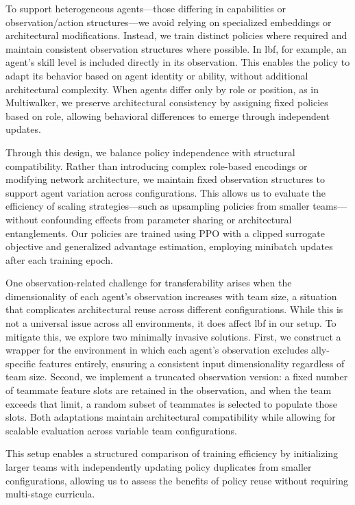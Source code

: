 To support heterogeneous agents—those differing in capabilities or observation/action 
structures—we avoid relying on specialized embeddings or architectural modifications. 
Instead, we train distinct policies where required and maintain consistent observation 
structures where possible. In \gls{lbf}, for example, an agent's skill level is included 
directly in its observation. This enables the policy to adapt its behavior based on 
agent identity or ability, without additional architectural complexity. 
When agents differ only by role or position, as in Multiwalker, 
we preserve architectural consistency by assigning fixed policies based on role, 
allowing behavioral differences to emerge through independent updates.

Through this design, we balance policy independence with structural compatibility. 
Rather than introducing complex role-based encodings or modifying network architecture, 
we maintain fixed observation structures to support agent variation across configurations. 
This allows us to evaluate the efficiency of scaling strategies—such as upsampling policies from 
smaller teams—without confounding effects from parameter sharing or architectural entanglements. 
Our policies are trained using PPO with a clipped surrogate objective and generalized 
advantage estimation, employing minibatch updates after each training epoch.

One observation-related challenge for transferability arises when the dimensionality 
of each agent's observation increases with team size, a situation that complicates 
architectural reuse across different configurations. While this is not a universal issue 
across all environments, it does affect \gls{lbf} in our setup. 
To mitigate this, we explore two minimally invasive solutions. First, we construct a wrapper 
for the environment in which each agent's observation excludes ally-specific features entirely, 
ensuring a consistent input dimensionality regardless of team size. Second, 
we implement a truncated observation version: a fixed number of teammate feature slots 
are retained in the observation, and when the team exceeds that limit, a random subset of 
teammates is selected to populate those slots. Both adaptations maintain architectural 
compatibility while allowing for scalable evaluation across variable team configurations.

This setup enables a structured comparison of training efficiency by initializing larger teams 
with independently updating policy duplicates from smaller configurations, allowing us to assess 
the benefits of policy reuse without requiring multi-stage curricula.

